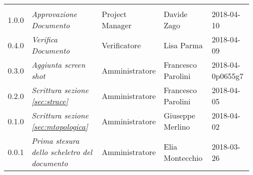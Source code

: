 \newpage 
\section*{}
\begin{table}[H]
	\centering
	\begin{tabular}{C{2cm}|C{4cm}|C{3cm}|C{3cm}|R{2cm}}
		
		 & & & & \\
		
		
			1.0.0  & \emph{Approvazione Documento} & Project Manager & Davide Zago &  2018-04-10 \\
		\hline
		
		0.4.0  & \emph{Verifica Documento} & Verificatore & Lisa Parma &  2018-04-09 \\
		\hline
		
		0.3.0 & \emph{Aggiunta screen shot} & Amministratore & Francesco Parolini &  2018-04-0p0655g7 \\
		
		0.2.0 & \emph{Scrittura sezione \ref{sec:strace}} & Amministratore & Francesco Parolini &  2018-04-05 \\
		\hline
		
		0.1.0 & \emph{Scrittura sezione \ref{sec:mtopologica}} & Amministratore & Giuseppe Merlino &  2018-04-02 \\
		\hline
		
		
		0.0.1 & \emph{Prima stesura dello scheletro del documento} & Amministratore & Elia Montecchio &  2018-03-26 \\
		
		
	\end{tabular}
	
\end{table}


\clearpage